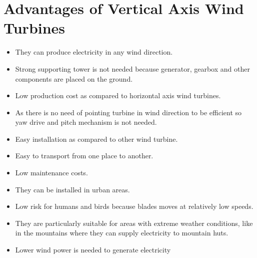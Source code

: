 \documentclass[12pt,a4paper]{article}
\begin{document}
\section{Advantages of Vertical Axis Wind Turbines}
\begin{itemize}
\item They can produce electricity in any wind direction.
\item Strong supporting tower is not needed because generator, gearbox and other components are placed on the ground.
\item Low production cost as compared to horizontal axis wind turbines.
\item As there is no need of pointing turbine in wind direction to be efficient so yaw drive and pitch mechanism is not needed.
\item Easy installation as compared to other wind turbine.
\item Easy to transport from one place to another.
\item Low maintenance costs.
\item They can be installed in urban areas.
\item Low risk for humans and birds because blades moves at relatively low speeds.
\item They are particularly suitable for areas with extreme weather conditions, like in the mountains where they can supply electricity to mountain huts.
\item Lower wind power is needed to generate electricity
\end{itemize}


\newpage
\end{document}
